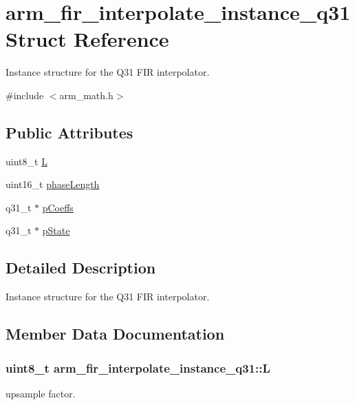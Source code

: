 \hypertarget{structarm__fir__interpolate__instance__q31}{}\section{arm\+\_\+fir\+\_\+interpolate\+\_\+instance\+\_\+q31 Struct Reference}
\label{structarm__fir__interpolate__instance__q31}


Instance structure for the Q31 F\+IR interpolator.  




{\ttfamily \#include $<$arm\+\_\+math.\+h$>$}

\subsection*{Public Attributes}
\begin{DoxyCompactItemize}
\item 
uint8\+\_\+t \hyperlink{structarm__fir__interpolate__instance__q31_a5cdf0a631cb74e0e9588c388abe5235c}{L}
\item 
uint16\+\_\+t \hyperlink{structarm__fir__interpolate__instance__q31_a5d243796584afc7cd6c557f00b7acca5}{phase\+Length}
\item 
q31\+\_\+t $\ast$ \hyperlink{structarm__fir__interpolate__instance__q31_afa719433687e1936ec3403d0d32f06e6}{p\+Coeffs}
\item 
q31\+\_\+t $\ast$ \hyperlink{structarm__fir__interpolate__instance__q31_addde04514b6e6ac72be3d609f0398b1a}{p\+State}
\end{DoxyCompactItemize}


\subsection{Detailed Description}
Instance structure for the Q31 F\+IR interpolator. 

\subsection{Member Data Documentation}
\subsubsection[{\texorpdfstring{L}{L}}]{\setlength{\rightskip}{0pt plus 5cm}uint8\+\_\+t arm\+\_\+fir\+\_\+interpolate\+\_\+instance\+\_\+q31\+::L}\hypertarget{structarm__fir__interpolate__instance__q31_a5cdf0a631cb74e0e9588c388abe5235c}{}\label{structarm__fir__interpolate__instance__q31_a5cdf0a631cb74e0e9588c388abe5235c}
upsample factor. 
